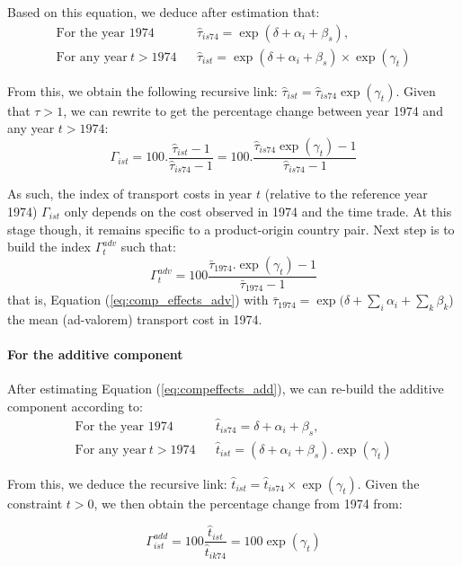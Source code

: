 \documentclass[a4paper,11pt]{article}
\begin{document}
Based on this equation, we deduce after estimation that:
\begin{eqnarray*}
\text{For the year 1974}&& \widehat{\tau}_{is74} = \exp(\delta +\alpha_i+\beta_s), \\
\text{For any year}~t> 1974&& \widehat{\tau}_{ist} = \exp(\delta +\alpha_i+\beta_s)\times \exp(\gamma_t)
\end{eqnarray*}

From this, we obtain the following recursive link: $\widehat{\tau}_{ist} = \widehat{\tau}_{is74}\exp(\gamma_t)$. Given that $\tau >1$, we can rewrite to get the percentage change between year 1974 and any year $t>1974$:
$$\Gamma_{ist} = 100.\frac{\widehat{\tau}_{ist}-1}{\widehat{\tau}_{is74}-1} = 100.\frac{\widehat{\tau}_{is74}\exp(\gamma_t)-1}{\widehat{\tau}_{is74}-1}$$

As such, the index of transport costs in year $t$ (relative to the reference year 1974) $\Gamma_{ist} $  only depends on the cost observed in 1974 and the time trade. At this stage though, it remains specific to a product-origin country pair. Next step is to build the index $\Gamma^{adv}_t$ such that:
\begin{equation*}
 \Gamma^{adv}_t= 100\frac {\bar{\tau}_{1974}.\exp(\gamma_t)-1} {\bar{\tau}_{1974}-1}  \label{eq:tcadv_compoeffect}
\end{equation*}
\noindent that is, Equation (\ref{eq:comp_effects_adv}) with $\bar{\tau}_{1974} = \exp(\delta + \sum_i \alpha_i + \sum_k \beta_k$) the mean (ad-valorem) transport cost in 1974.

\paragraph{For the additive component} After estimating Equation (\ref{eq:compeffects_add}), we can re-build the additive component according to:
\begin{eqnarray*}
\text{For the year 1974}&&\widehat{t}_{is74}=  \delta + \alpha_i+ \beta_s, \\
\text{For any year}~t> 1974&&\widehat{t}_{ist}=\left(\delta + \alpha_i+ \beta_s\right).\exp(\gamma_t)
\end{eqnarray*}

From this, we deduce the recursive link: $\widehat{t}_{ist} = \widehat{t}_{is74} \times \exp(\gamma_t)$. Given the constraint $t>0$, we then obtain the percentage change from 1974 from:

\begin{equation*}
\Gamma^{add}_{ist} = 100\frac{\widehat{t}_{ist}}{\widehat{t}_{ik74}} = 100\exp(\gamma_t)
\end{equation*}
\end{document}
